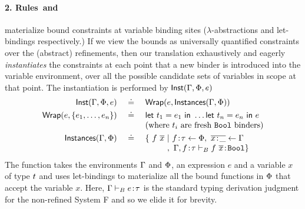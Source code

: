 

\paragraph{2. Rules~\txFun and~\txLet} materialize bound
constraints at variable binding sites ($\lambda$-abstractions
and let-bindings respectively.)
%
%
If we view the bounds as universally quantified constraints
over the (abstract) refinements, then our translation exhaustively
and eagerly \emph{instantiates} the constraints at each point that
a new binder is introduced into the variable environment, over all
the possible candidate sets of variables in scope at that point.
%
The instantiation is performed by $\closure{\cenv}{\benv}{e}{x:\rtyp}$
%
$$\begin{array}{rcl}
\closure{\cenv}{\benv}{e}{\tbind{x}{\utyp}}
  & \defeq & {\wraplet{e}{\cands{\cenv}{\benv}}} \\[0.05in]
\wraplet{e}{\set{e_1,\ldots,e_n}}
  & \defeq & {\elett{t_1}{e_1}{\ldots} \elett{t_n}{e_n}{e}} \\
  &        & {\mbox{(where $t_i$ are fresh \tbbool binders)}} \\[0.05in]
\cands{\cenv}{\benv}
  & \defeq & \{ \  f\ \overline{x}  \ | \ \tbind{f}{\utyp} \leftarrow \benv
                  , \ \overline{\tbind{x}{\_}} \leftarrow \cenv \\
  &        & \qquad \ \ , \ \EXT{\cenv}{f}{\utyp} \vdash_B \tbind{ f\ \overline{x}}{\tbbool} \} \
\end{array}$$
The function takes the environments
$\cenv$ and $\benv$, an expression $e$ and a variable $x$ of type
$\rtyp$ and uses let-bindings to materialize all the bound
functions in $\benv$ that accept the variable $x$.
%
Here, $\cenv \vdash_B \tbind{e}{\utyp}$ is the standard typing
derivation judgment for the non-refined System F and so
we elide it for brevity.


